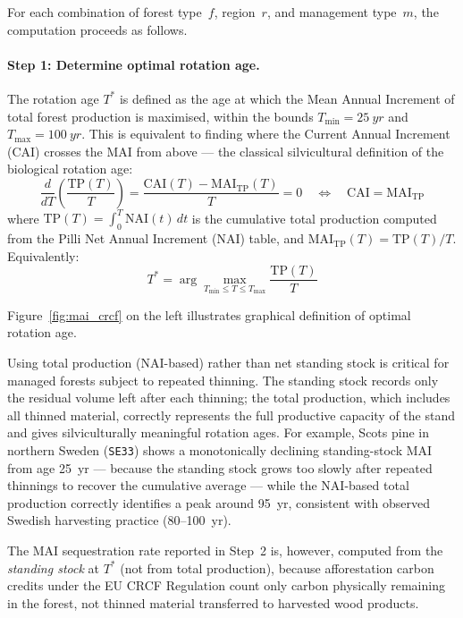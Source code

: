 \documentclass[12pt, a4paper]{article}
\begin{document}
For each combination of forest type~$f$, region~$r$, and management type~$m$,
the computation proceeds as follows.

\paragraph{Step 1: Determine optimal rotation age.}
The rotation age $T^*$ is defined as the age at which the Mean Annual Increment
of total forest production is maximised, within the bounds $T_\text{min} = \SI{25}{yr}$
and $T_\text{max} = \SI{100}{yr}$. This is equivalent to finding where the Current
Annual Increment (CAI) crosses the MAI from above --- the classical silvicultural
definition of the biological rotation age:
\begin{equation}
    \frac{d}{dT}\!\left(\frac{\mathrm{TP}(T)}{T}\right)
    = \frac{\mathrm{CAI}(T) - \mathrm{MAI}_\text{TP}(T)}{T} = 0
    \quad \Leftrightarrow \quad \mathrm{CAI} = \mathrm{MAI}_\text{TP}
    \label{eq:cai_mai_crossing}
\end{equation}
where $\mathrm{TP}(T) = \int_0^T \mathrm{NAI}(t)\,dt$ is the cumulative total
production computed from the Pilli Net Annual Increment (NAI) table, and
$\mathrm{MAI}_\text{TP}(T) = \mathrm{TP}(T)/T$.
Equivalently:
\begin{equation}
    T^* = \arg\max_{T_\text{min} \leq T \leq T_\text{max}} \frac{\mathrm{TP}(T)}{T}
    \label{eq:rotation_age}
\end{equation}

Figure~\ref{fig:mai_crcf} on the left illustrates graphical definition of optimal rotation age.

Using total production (NAI-based) rather than net standing stock is critical for
managed forests subject to repeated thinning. The standing stock records only the
residual volume left after each thinning; the total production, which includes all
thinned material, correctly represents the full productive capacity of the stand and
gives silviculturally meaningful rotation ages. For example, Scots pine in northern
Sweden (\texttt{SE33}) shows a monotonically declining standing-stock MAI from age
\SI{25}{yr} --- because the standing stock grows too slowly after repeated thinnings
to recover the cumulative average --- while the NAI-based total production correctly
identifies a peak around \SI{95}{yr}, consistent with observed Swedish harvesting
practice (80--100~yr).

The MAI sequestration rate reported in Step~2 is, however, computed from the
\emph{standing stock} at $T^*$ (not from total production), because afforestation
carbon credits under the EU CRCF Regulation count only carbon physically remaining
in the forest, not thinned material transferred to harvested wood products.
\end{document}
